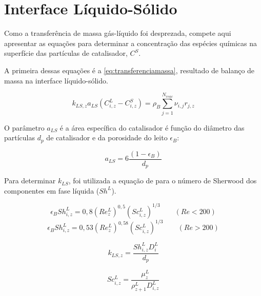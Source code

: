 
\section{Interface Líquido-Sólido} \label{sec:interfaceliquidosolido}

Como a transferência de massa gás-líquido foi desprezada, compete aqui
apresentar as equações para determinar a concentração das espécies químicas
na superfície das partículas de catalisador, $C^S$. 

A primeira dessas equações é a \autoref{eq:transferenciamassa}, resultado de
balanço de massa na interface líquido-sólido.

\begin{equation}
k_{LS,z}a_{LS}(C^L_{i,z}-C^S_{i,z}) = \rho_B \displaystyle\sum_{j=1}^{N_{reac}}
\nu_{i,j}r_{j,z}
\label{eq:transferenciamassa}
\end{equation}

O parâmetro $a_{LS}$ é a área específica do catalisador é função do diâmetro das
partículas $d_p$ de catalisador e da porosidade do leito $\epsilon_B$:

\begin{equation}
a_{LS} = 6 \dfrac{(1-\epsilon_B)}{d_p}
\label{eq:aLS}
\end{equation}

Para determinar $k_{LS}$, foi utilizada a equação de 
para o número de Sherwood dos componentes em fase líquida ($Sh^L$).

\begin{equation}
\epsilon_BSh^L_{i,z} = 0,8(Re^L_z)^{0,5}(Sc^L_{i,z})^{1/3} \qquad (Re<200)
\label{eq:Sh1}
\end{equation}
\begin{equation}
\epsilon_BSh^L_{i,z} = 0,53(Re^L_z)^{0,58}(Sc^L_{i,z})^{1/3} \qquad (Re>200)
\label{eq:Sh2}
\end{equation}

\begin{equation}
k_{LS,z} = \dfrac{Sh^L_{i,z}D^L_{i}}{d_p}
\label{eq:kLS}
\end{equation}

\begin{equation} 
Sc^L_{i,z} = \dfrac{\mu^L_{z}}{\rho^L_{z+1}D^L_{i,z}}
\label{eq:Sc}
\end{equation}

